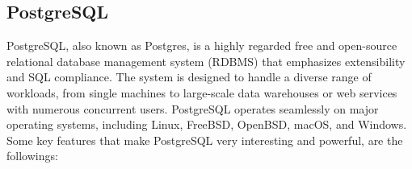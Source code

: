 \documentclass[conference]{IEEEtran}
\begin{document}

\subsection{PostgreSQL}

PostgreSQL, also known as Postgres, is a highly regarded free and open-source relational database management system (RDBMS) that emphasizes
extensibility and SQL compliance. The system is designed to handle a diverse range of workloads, from single machines to large-scale data warehouses
or web services with numerous concurrent users. PostgreSQL operates seamlessly on major operating systems, including Linux, FreeBSD, OpenBSD, macOS, and Windows.
Some key features that make PostgreSQL very interesting and powerful, are the followings:
\end{document}
